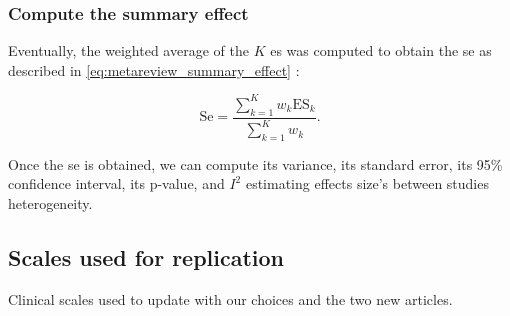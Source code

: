 \subsubsection{Compute the summary effect}

Eventually, the weighted average of the $K$ \gls{es} was computed to obtain the \gls{se} as described in 
\cref{eq:metareview_summary_effect} \citep{Borenstein2009}:

\begin{equation}
\label{eq:metareview_summary_effect}
\text{Se} = \frac{\sum_{k=1}^{K} w_k \text{ES}_k} {\sum_{k=1}^{K} w_k}.
\end{equation} 

Once the \gls{se}  is obtained, we can compute its variance, its standard error, its 95\% confidence interval, its p-value, 
and $I^2$ estimating effects size's between studies heterogeneity. 

\subsection{Scales used for replication}

\begin{table}[h!]
  \centering
  \caption{Clinical scales used to update \citet{Cortese2016} with our choices and the two new articles.}

  \label{Table:Table_mr_clinical_scales_update_cortese}
\end{table}
